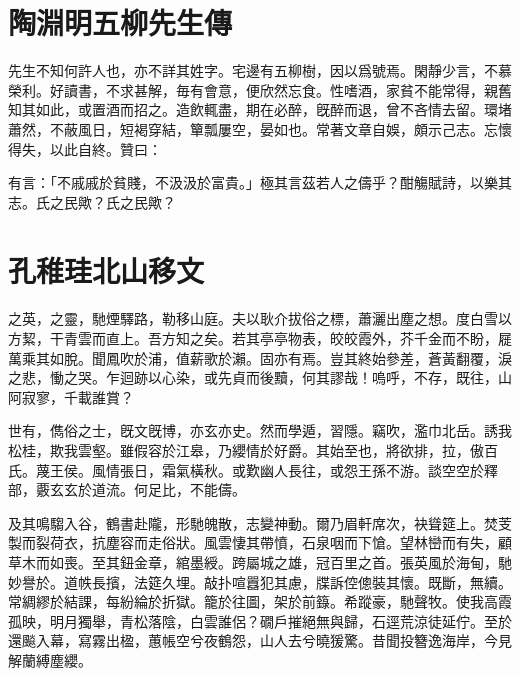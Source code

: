 \section[五柳先生傳\quad{\small 陶淵明}]{{\normalsize 陶淵明}\quad 五柳先生傳}
先生不知何許人也，亦不詳其姓字。宅邊有五柳樹，因以爲號焉。閑靜少言，不慕榮利。好讀書，不求甚解，毎有會意，便欣然忘食。性嗜酒，家貧不能常得，親舊知其如此，或置酒而招之。造飲輒盡，期在必醉，旣醉而退，曾不吝情去留。環堵蕭然，不蔽風日，短褐穿結，簞瓢屢空，晏如也。常著文章自娛，頗示己志。忘懷得失，以此自終。贊曰：

有言：「不戚戚於貧賤，不汲汲於富貴。」極其言茲若人之儔乎？酣觴賦詩，以樂其志。氏之民歟？氏之民歟？

\theendnotes

\section[北山移文\quad{\small 孔稚珪}]{{\normalsize 孔稚珪}\quad 北山移文}
之英，之靈，馳煙驛路，勒移山庭。夫以耿介拔俗之標，蕭灑出塵之想。度白雪以方絜，干青雲而直上。吾方知之矣。若其亭亭物表，皎皎霞外，芥千金而不盼，屣萬乘其如脫。聞鳳吹於浦，值薪歌於瀨。固亦有焉。豈其終始參差，蒼黃翻覆，淚之悲，慟之哭。乍迴跡以心染，或先貞而後黷，何其謬哉！嗚呼，不存，既往，山阿寂寥，千載誰賞？

世有，儁俗之士，旣文旣博，亦玄亦史。然而學遁，習隱。竊吹，濫巾北岳。誘我松桂，欺我雲壑。雖假容於江皋，乃纓情於好爵。其始至也，將欲排，拉，傲百氏。蔑王侯。風情張日，霜氣橫秋。或歎幽人長往，或怨王孫不游。談空空於釋部，覈玄玄於道流。何足比，不能儔。

及其鳴騶入谷，鶴書赴隴，形馳魄散，志變神動。爾乃眉軒席次，袂聳筵上。焚芰製而裂荷衣，抗塵容而走俗狀。風雲悽其帶憤，石泉咽而下愴。望林巒而有失，顧草木而如喪。至其鈕金章，綰墨綬。跨屬城之雄，冠百里之首。張英風於海甸，馳妙譽於。道帙長擯，法筵久埋。敲扑喧囂犯其慮，牒訴倥傯裝其懷。既斷，無續。常綢繆於結課，每紛綸於折獄。籠於往圖，架於前籙。希蹤豪，馳聲牧。使我高霞孤映，明月獨舉，青松落陰，白雲誰侶？礀戶摧絕無與歸，石逕荒涼徒延佇。至於還飈入幕，寫霧出楹，蕙帳空兮夜鶴怨，山人去兮曉猨驚。昔聞投簪逸海岸，今見解蘭縛塵纓。

